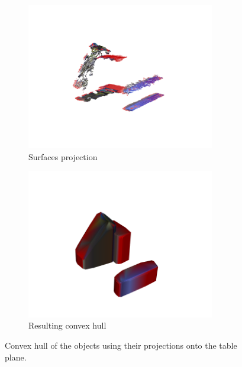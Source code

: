 \begin{figure}[h]
\centering
\begin{subfigure}[t]{0.45\textwidth}
\centering
\includegraphics[width=0.9\textwidth]{Img/convexhull/projection.png}
\caption{Surfaces projection}\label{fig:projection}
\end{subfigure}
\begin{subfigure}[t]{0.45\textwidth}
\centering
\includegraphics[width=0.9\textwidth]{Img/convexhull/full_convexhull.png}
\caption{Resulting convex hull}\label{fig:full_convexhull_}
\end{subfigure}
\caption{Convex hull of the objects using their projections onto the table plane.}\label{fig:full_convexhull}
\end{figure}


